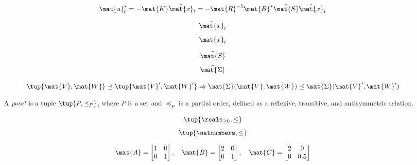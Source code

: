 {\begin{forslides}
        \begin{equation}
            \label{eq:optimal_control}
            \mat{u}_t^\star =-\mat{K}\hat{\mat{x}}_t=-\mat{R}^{-1}\mat{B}^*\bar{\mat{S}}\hat{\mat{x}}_t
        \end{equation}

        \begin{equation}
            \label{eq:x_estimate}
            \hat{\mat{x}}_t
        \end{equation}
        \begin{equation}
            \label{eq:x_real}
            \mat{x}_t
        \end{equation}

        \begin{equation}
            \label{eq:ric_1}
            \bar{\mat{S}}
        \end{equation}
        \begin{equation}
            \label{eq:ric_2}
            \bar{\mat{\Sigma}}
        \end{equation}

        \begin{equation}
            \label{eq:mon_est}
            \tup{\mat{V},\mat{W}}\preceq \tup{\mat{V}',\mat{W}'} \Rightarrow \mat{\Sigma}(\mat{V},\mat{W})\preceq \mat{\Sigma}(\mat{V}',\mat{W}')
        \end{equation}

        \begin{definition}
            \label{def:poset_cont}
            A \emph{poset} is a tuple $\tup{P,\preceq_P}$, where $P$ is a set and $\preceq_P$ is a partial order, defined as a reflexive, transitive, and antisymmetric relation.
        \end{definition}

        \begin{equation}
            \label{eq:posreals}
            \tup{\reals_{\geq 0},\leq}
        \end{equation}
        \begin{equation}
            \label{eq:nats}
            \tup{\natnumbers,\leq}
        \end{equation}

        \begin{equation}
            \label{eq:matrix_poset}
            \mat{A}=\begin{bmatrix}
                1 & 0 \\0& 1
            \end{bmatrix}, \quad \mat{B}=\begin{bmatrix}
                2 & 0 \\0& 1
            \end{bmatrix},\quad \mat{C}=\begin{bmatrix}
                2 & 0 \\0& 0.5
            \end{bmatrix}
        \end{equation}


\end{forslides}}
